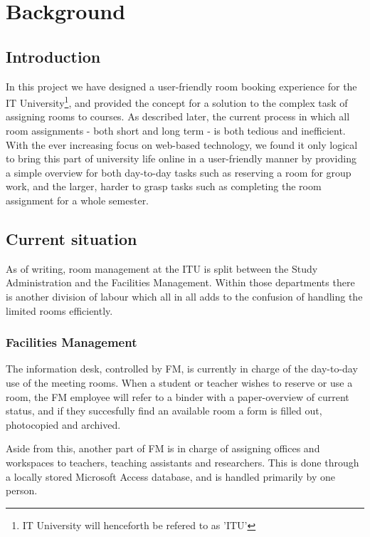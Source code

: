\chapter{Background}
\section{Introduction}
In this project we have designed a user-friendly room booking experience for the IT University\footnote{IT University will henceforth be refered to as 'ITU'}, and provided the concept for a solution to the complex task of assigning rooms to courses. As described later, the current process in which all room assignments - both short and long term - is both tedious and inefficient. With the ever increasing focus on web-based technology, we found it only logical to bring this part of university life online in a user-friendly manner by providing a simple overview for both day-to-day tasks such as reserving a room for group work, and the larger, harder to grasp tasks such as completing the room assignment for a whole semester.

\pagebreak
\section{Current situation}
As of writing, room management at the ITU is split between the Study Administration and the Facilities Management. Within those departments there is another division of labour which all in all adds to the confusion of handling the limited rooms efficiently.

\subsection{Facilities Management}
The information desk, controlled by FM, is currently in charge of the day-to-day use of the meeting rooms. When a student or teacher wishes to reserve or use a room, the FM employee will refer to a binder with a paper-overview of current status, and if they succesfully find an available room a form is filled out, photocopied and archived.

Aside from this, another part of FM is in charge of assigning offices and workspaces to teachers, teaching assistants and researchers. This is done through a locally stored Microsoft Access database, and is handled primarily by one person.

